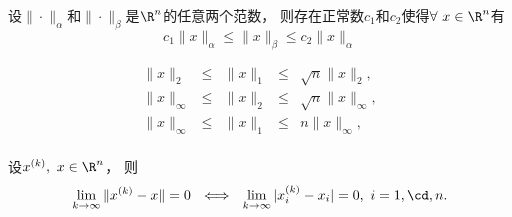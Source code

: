 \begin{frame}\ft{\subsecname}
\begin{dingli}[范数等价性]
设$\|\cdot\|_{\alpha}$和$\|\cdot\|_{\beta}$是$\R^n$的任意两个范数，
则存在正常数$c_1$和$c_2$使得$\forall~x\in\R^n$有
$$
c_1\|x\|_{\alpha}\le\|x\|_{\beta}\le c_2\|x\|_{\alpha}
$$
\end{dingli}

$$
\begin{array}{ccccc}
\|x\|_{2} &\le& \|x\|_{1} &\le& \sqrt{n} \|x\|_{2},\\[0.2cm]
\|x\|_{\infty} &\le& \|x\|_{2} &\le& \sqrt{n} \|x\|_{\infty},\\[0.2cm]
\|x\|_{\infty} &\le& \|x\|_{1} &\le& n\|x\|_{\infty},\\
\end{array}
$$

\end{frame}

\begin{frame}\ft{\subsecname}
\begin{dingli}
设$x^{(k)},~x\in \R^n$，
则
$$\lim_{k\to\infty}\|x^{(k)}-x\|=0
~~\Longleftrightarrow~~
\lim_{k\to\infty} |x_i^{(k)}-x_i|=0,~i=1,\cd,n.
$$
\end{dingli}
\end{frame}

